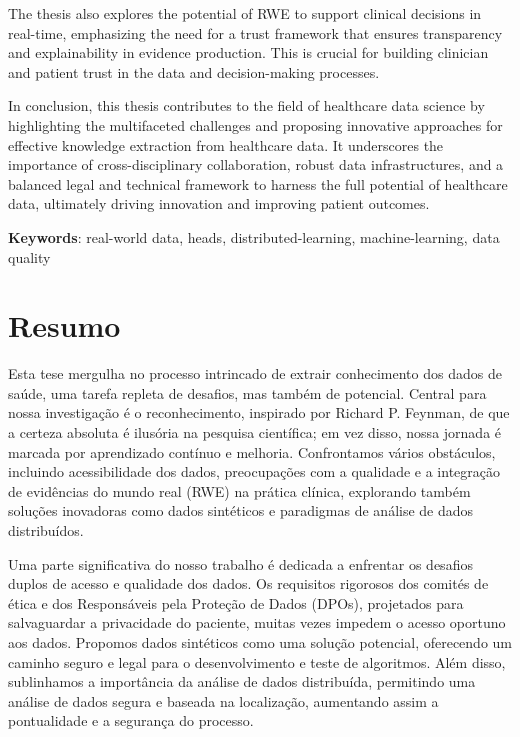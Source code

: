 The thesis also explores the potential of RWE to support clinical decisions in real-time, emphasizing the need for a trust framework that ensures transparency and explainability in evidence production. This is crucial for building clinician and patient trust in the data and decision-making processes.

In conclusion, this thesis contributes to the field of healthcare data science by highlighting the multifaceted challenges and proposing innovative approaches for effective knowledge extraction from healthcare data. It underscores the importance of cross-disciplinary collaboration, robust data infrastructures, and a balanced legal and technical framework to harness the full potential of healthcare data, ultimately driving innovation and improving patient outcomes.

\vspace*{10mm}\noindent
\textbf{Keywords}: real-world data, \ac{heads}, distributed-learning, machine-learning, data quality

\chapter*{Resumo}

Esta tese mergulha no processo intrincado de extrair conhecimento dos dados de saúde, uma tarefa repleta de desafios, mas também de potencial. Central para nossa investigação é o reconhecimento, inspirado por Richard P. Feynman, de que a certeza absoluta é ilusória na pesquisa científica; em vez disso, nossa jornada é marcada por aprendizado contínuo e melhoria. Confrontamos vários obstáculos, incluindo acessibilidade dos dados, preocupações com a qualidade e a integração de evidências do mundo real (RWE) na prática clínica, explorando também soluções inovadoras como dados sintéticos e paradigmas de análise de dados distribuídos.

Uma parte significativa do nosso trabalho é dedicada a enfrentar os desafios duplos de acesso e qualidade dos dados. Os requisitos rigorosos dos comités de ética e dos Responsáveis pela Proteção de Dados (DPOs), projetados para salvaguardar a privacidade do paciente, muitas vezes impedem o acesso oportuno aos dados. Propomos dados sintéticos como uma solução potencial, oferecendo um caminho seguro e legal para o desenvolvimento e teste de algoritmos. Além disso, sublinhamos a importância da análise de dados distribuída, permitindo uma análise de dados segura e baseada na localização, aumentando assim a pontualidade e a segurança do processo.

